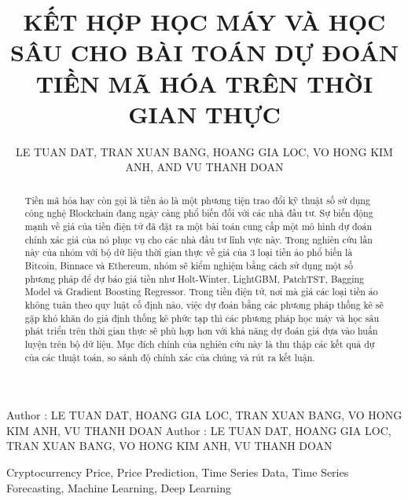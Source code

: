 \documentclass{ieeeojies}
\begin{document}
\title{\textbf{KẾT HỢP HỌC MÁY VÀ HỌC SÂU CHO BÀI TOÁN DỰ ĐOÁN TIỀN MÃ HÓA TRÊN THỜI GIAN THỰC }}

\author{\uppercase{LE TUAN DAT},
\uppercase{TRAN XUAN BANG, HOANG GIA LOC, VO HONG KIM ANH, and VU THANH DOAN}}

\address[1]{Khoa Khoa Học Và Kỹ Thuật Thông Tin,Đại Học Công Nghê Thông Tin - ĐHQG TP.HCM (21520699@gm.uit.edu.vn)}
\address[2]{Khoa Hệ Thống Thông Tin,Đại Học Công Nghê Thông Tin - ĐHQG TP.HCM (21521847@gm.uit.edu.vn)}
\address[3]{Khoa Hệ Thống Thông Tin,Đại Học Công Nghê Thông Tin - ĐHQG TP.HCM (21521086@gm.uit.edu.vn)}
\address[4]{Khoa Hệ Thống Thông Tin,Đại Học Công Nghê Thông Tin - ĐHQG TP.HCM (21520597@gm.uit.edu.vn)}
\address[5]{Khoa Hệ Thống Thông Tin,Đại Học Công Nghê Thông Tin - ĐHQG TP.HCM (21520191@gm.uit.edu.vn)}

\markboth
{Author \headeretal: LE TUAN DAT, HOANG GIA LOC, TRAN XUAN BANG, VO HONG KIM ANH, VU THANH DOAN}
{Author \headeretal: LE TUAN DAT, HOANG GIA LOC, TRAN XUAN BANG, VO HONG KIM ANH, VU THANH DOAN}

\begin{abstract}
Tiền mã hóa hay còn gọi là tiền ảo là một phương tiện trao đổi kỹ thuật số sử dụng công nghệ Blockchain đang ngày càng phổ biến đối với các nhà đầu tư. Sự biến động mạnh về giá của tiền điện tử đã đặt ra một bài toán cung cấp một mô hình dự đoán chính xác giá của nó phục vụ cho các nhà đầu tư lĩnh vực này. Trong nghiên cứu lần này của nhóm với bộ dữ liệu thời gian thực về giá của 3 loại tiền ảo phổ biến là Bitcoin, Binnace và Ethereum, nhóm sẽ kiểm nghiệm bằng cách sử dụng một số phương pháp để dự báo giá tiền như Holt-Winter, LightGBM, PatchTST, Bagging Model và Gradient Boosting Regressor. Trong tiền điện tử, nơi mà giá các loại tiền ảo không tuân theo quy luật cố định nào, việc dự đoán bằng các phương pháp thống kê sẽ gặp khó khăn do giả định thống kê phức tạp thì các phương pháp học máy và học sâu phát triển trên thời gian thực sẽ phù hợp hơn với khả năng dự đoán giá dựa vào huấn luyện trên bộ dữ liệu. Mục đích chính của nghiên cứu này là thu thập các kết quả dự của các thuật toán, so sánh độ chính xác của chúng và rút ra kết luận.
\end{abstract}

\begin{keywords}
Cryptocurrency Price, Price Prediction, Time Series Data, Time Series Forecasting, Machine Learning, Deep Learning 
\end{keywords}
\end{document}
